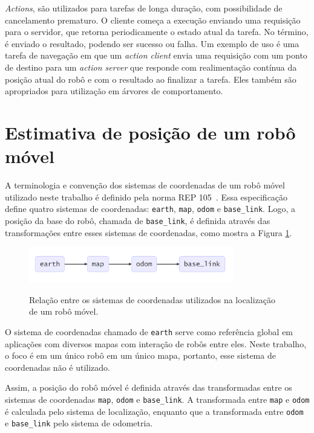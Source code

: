 \documentclass[repeatfields,xlists,xpacks,oneside,yearsonly]{ufrgscca}
\begin{document}
\textit{Actions}, são utilizados para tarefas de longa duração, com possibilidade de
cancelamento prematuro.
O cliente começa a execução enviando uma requisição para o servidor,
que retorna periodicamente o estado atual da tarefa.
No término, é enviado o resultado, podendo ser sucesso ou falha.
Um exemplo de uso é uma tarefa de navegação em que um \textit{action client}
envia uma requisição com um ponto de destino para um \textit{action server}
que responde com realimentação contínua da posição atual do robô e
com o resultado ao finalizar a tarefa.
Eles também são apropriados para utilização em árvores de comportamento.

\section{Estimativa de posição de um robô móvel}

A terminologia e convenção dos sistemas de coordenadas de um robô
móvel utilizado neste trabalho é definido pela norma REP
105~\cite{rep_105}. Essa especificação define quatro sistemas de
coordenadas: \texttt{earth}, \texttt{map}, \texttt{odom} e
\texttt{base\_link}. Logo, a posição da base do robô, chamada de
\texttt{base\_link}, é definida através das transformações entre
esses sistemas de coordenadas, como mostra a Figura
\ref{fig:rep_105}.

\begin{figure}[H]
    {
        \centering
        \caption{Relação entre os sistemas de coordenadas utilizados na localização de um robô móvel.}
        \label{fig:rep_105}
        \includegraphics[width=0.8\textwidth]{tf_rep_105.png}\\
    }
    {}
\end{figure}

O sistema de coordenadas chamado de \texttt{earth} serve como
referência global em aplicações com diversos mapas com interação de
robôs entre eles. Neste trabalho, o foco é em um único robô em um
único mapa, portanto, esse sistema de coordenadas não é utilizado.

Assim, a posição do robô móvel é definida através das transformadas
entre os sistemas de coordenadas \texttt{map}, \texttt{odom} e
\texttt{base\_link}. A transformada entre \texttt{map} e
\texttt{odom} é calculada pelo sistema de localização, enquanto que a
transformada entre \texttt{odom} e \texttt{base\_link} pelo sistema
de odometria.
\end{document}
